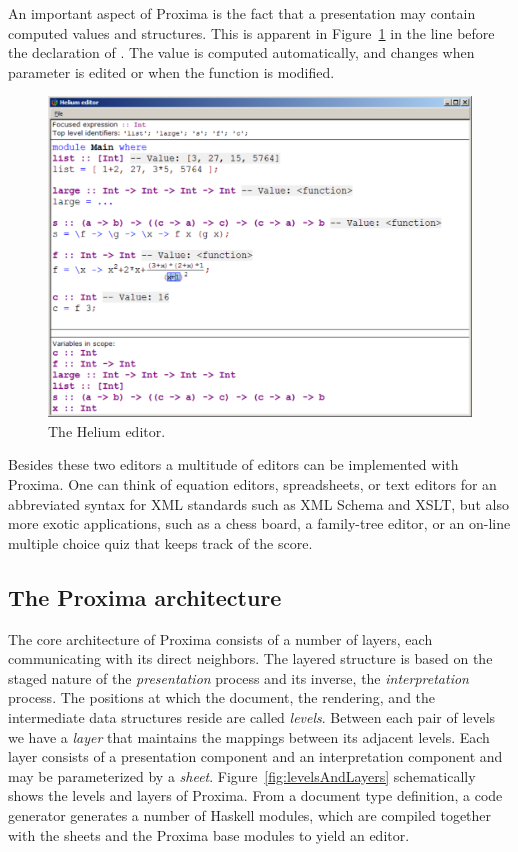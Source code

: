 \documentclass[10pt]{article}
\begin{document}
An important aspect of Proxima is the fact that a presentation may contain computed values and structures. This is apparent in Figure~\ref{fig:heliumEditor} in the line before the declaration of . The value  is computed automatically, and changes when parameter  is edited or when the function  is modified.

\begin{figure}
\includegraphics[width=12cm]{images/heliumMainWindow}
\caption{The Helium editor.}
\label{fig:heliumEditor}
\end{figure}

Besides these two editors a multitude of editors can be implemented with Proxima. One can think of equation editors, spreadsheets, or text editors for an abbreviated syntax for XML standards such as XML Schema and XSLT, but also more exotic applications, such as a chess board, a family-tree editor, or an on-line multiple choice quiz that keeps track of the score.


\subsection{The Proxima architecture}

The core architecture of Proxima consists of a number of layers, each communicating with its direct neighbors. The layered structure is based on the staged nature of the {\em presentation} process and its inverse, the {\em interpretation} process. The positions at which the document, the rendering, and the intermediate data structures reside are called {\em levels}. Between each pair of levels we have a {\em layer} that maintains the mappings between its adjacent levels. Each layer consists of a presentation component and an interpretation component and may be parameterized by a {\em sheet}. Figure~\ref{fig:levelsAndLayers} schematically shows the levels and layers of Proxima. From a document type definition, a code generator generates a number of Haskell modules, which are compiled together with the sheets and the Proxima base modules to yield an editor. 
\end{document}
